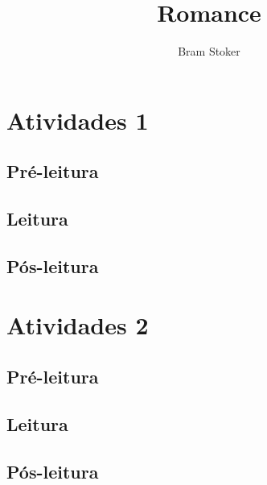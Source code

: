 \documentclass{article}
\begin{document}
\newcommand{\AutorLivro}{Bram Stoker} 
\newcommand{\TituloLivro}{Romance}
\newcommand{\Tema}{Ficção, mistério e fantasia}
\newcommand{\Genero}{Romance}
\newcommand{\imagemCapa}{PNLD0011-01.png}
\newcommand{\issnppub}{---}
\newcommand{\issnepub}{---}
\newcommand{\colaborador}{\textbf{Fulano de Tal} é uma pessoa incrível e vai fazer um bom serviço.}


\title{\TituloLivro}
\author{\AutorLivro}
\def\authornotes{\colaborador}

\date{}
\maketitle
\tableofcontents




\section{Atividades 1}


\subsection{Pré-leitura}
\subsection{Leitura}
\subsection{Pós-leitura}



\section{Atividades 2}

\subsection{Pré-leitura}
\subsection{Leitura}
\subsection{Pós-leitura}

\lipsum
\end{document}
